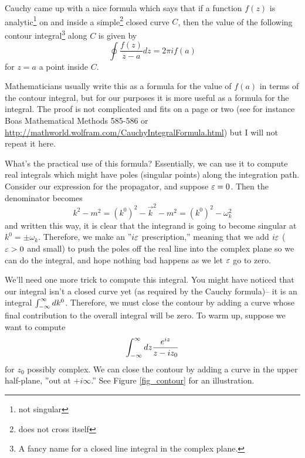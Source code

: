 Cauchy came up with a nice formula which says that if a function $f(z)$ is analytic\footnote{not singular} on and inside a simple\footnote{does not cross itself} closed curve $C$, then the value of the following contour integral\footnote{A fancy name for a closed line integral in the complex plane.} along $C$ is given by
$$\oint \frac{f(z)}{z-a}dz = 2\pi i f(a)$$
for $z=a$ a point inside $C$.

Mathematicians usually write this as a formula for the value of $f(a)$ in terms of the contour integral, but for our purposes it is more useful as a formula for the integral. The proof is not complicated and fits on a page or two (see for instance Boas Mathematical Methods 585-586 or \url{http://mathworld.wolfram.com/CauchyIntegralFormula.html}) but I will not repeat it here.

What's the practical use of this formula? Essentially, we can use it to compute real integrals which might have poles (singular points) along the integration path. Consider our expression for the propagator, and suppose $\varepsilon=0$. Then the denominator becomes $$k^2-m^2=(k^0)^2-\vec{k}^2-m^2=(k^0)^2- \omega_k^2$$
and written this way, it is clear that the integrand is going to become singular at $k^0=\pm \omega_k$. Therefore, we make an ''$i\varepsilon$ prescription,'' meaning that we add $i\varepsilon$ ($\varepsilon>0$ and small) to push the poles off the real line into the complex plane so we can do the integral, and hope nothing bad happens as we let $\varepsilon$ go to zero.

We'll need one more trick to compute this integral. You might have noticed that our integral isn't a closed curve yet (as required by the Cauchy formula)-- it is an integral $\int_{-\infty}^\infty dk^0$. Therefore, we must close the contour by adding a curve whose final contribution to the overall integral will be zero. To warm up, suppose we want to compute
$$\int_{-\infty}^\infty dz \frac{e^{iz}}{z-i z_0}$$
for $z_0$ possibly complex. We can close the contour by adding a curve in the upper half-plane, ''out at $+i\infty$.'' See Figure \ref{fig_contour} for an illustration. 

